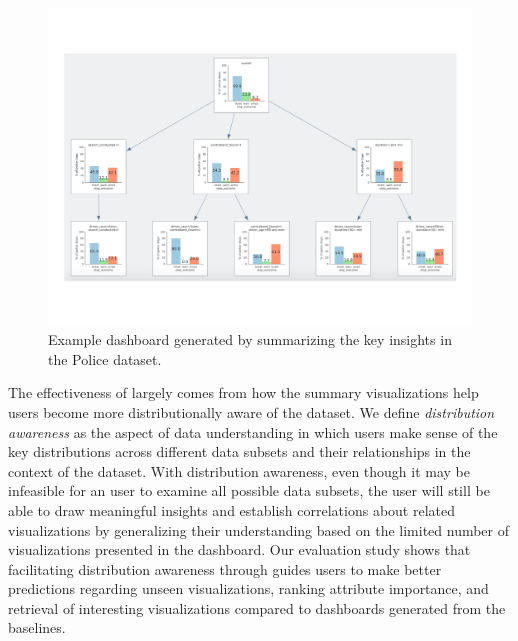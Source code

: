 \begin{figure}
\centering
\vspace{-10pt}
\includegraphics[width=\linewidth]{figures/storyboard.pdf}
\caption{Example dashboard generated by \sbd summarizing the key insights in the Police dataset.}
\label{fig:sbd}
\vspace{-10pt}
\end{figure} 

\par The effectiveness of \sbd largely 
comes from how the summary visualizations 
help users become more distributionally aware of the dataset. 
We define \emph{distribution awareness} 
as the aspect of data understanding in which users make sense of the key distributions across different data subsets and their relationships in the context of the dataset. With distribution awareness, 
even though it may be infeasible for an 
user to examine all possible data subsets, 
the user will still be able to draw meaningful 
insights and establish correlations 
about related visualizations by 
generalizing their understanding based 
on the limited number of visualizations
 presented in the dashboard. 
 Our evaluation study shows that facilitating 
 distribution awareness through \sbd 
 guides users to make better predictions 
 regarding unseen visualizations, 
 ranking attribute importance, and 
 retrieval of interesting visualizations 
 compared to dashboards generated from the baselines. %

